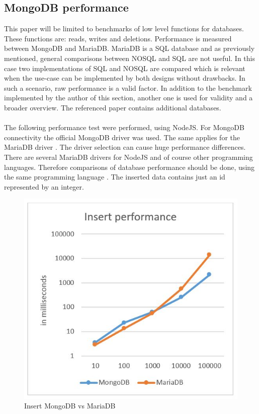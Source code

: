 \subsection{MongoDB performance}
This paper will be limited to benchmarks of low level functions for databases. These functions are: reads, writes and deletions. Performance is measured between MongoDB and MariaDB. MariaDB is a SQL database and as previously mentioned, general comparisons between NOSQL and SQL are not useful. In this case two implementations of SQL and NOSQL are compared which is relevant when the use-case can be implemented by both designs without drawbacks. In such a scenario, raw performance is a valid factor.
In addition to the benchmark implemented by the author of this section, another one is used for validity and a broader overview. The referenced paper contains additional databases.
\\\\
The following performance test were performed, using NodeJS. For MongoDB connectivity the official MongoDB driver  was used. The same applies for the MariaDB driver . The driver selection can cause huge performance differences. There are several MariaDB drivers for NodeJS and of course other programming languages. Therefore comparisons of database performance should be done, using the same programming language \cite{_mscdex.}. The inserted data contains just an id represented by an integer.
\begin{figure}[H]
\includegraphics[width=\linewidth,keepaspectratio]{images/Performance_Inserts.JPG}
\caption{Insert MongoDB vs MariaDB}
\end{figure}
